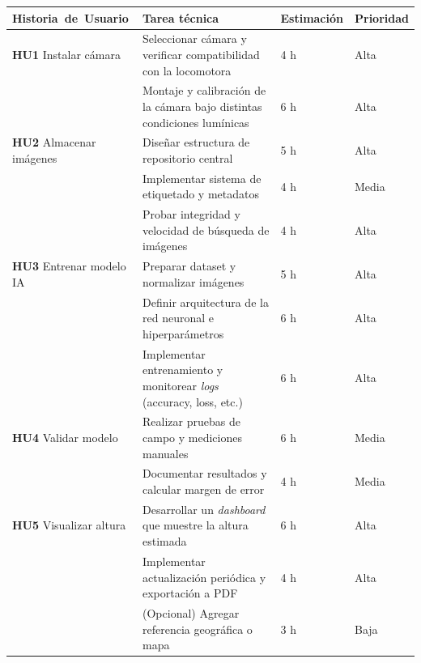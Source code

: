 \documentclass[
11pt, %
]{ProyectoVpC}
\begin{document}
\begin{table}[ht]
\centering
\renewcommand{\arraystretch}{1.15}
\begin{tabular}{@{}p{4.6cm} p{6cm} p{2cm} p{2.2cm}@{}}
\toprule
\textbf{\textbf{\mbox{Historia de Usuario}}} & \textbf{Tarea técnica} & \textbf{Estimación} & \textbf{Prioridad} \\
\midrule

\textbf{HU1} Instalar cámara 
  & Seleccionar cámara y verificar compatibilidad con la locomotora 
  & 4 h  
  & Alta \\

  & Montaje y calibración de la cámara bajo distintas condiciones lumínicas 
  & 6 h  
  & Alta \\
\midrule

\textbf{HU2} Almacenar imágenes 
  & Diseñar estructura de repositorio central 
  & 5 h  
  & Alta \\

  & Implementar sistema de etiquetado y metadatos 
  & 4 h  
  & Media \\

  & Probar integridad y velocidad de búsqueda de imágenes 
  & 4 h  
  & Alta \\
\midrule

\textbf{HU3} Entrenar modelo IA
  & Preparar dataset y normalizar imágenes 
  & 5 h  
  & Alta \\

  & Definir arquitectura de la red neuronal e hiperparámetros 
  & 6 h  
  & Alta \\

  & Implementar entrenamiento y monitorear \emph{logs} (accuracy, loss, etc.) 
  & 6 h  
  & Alta \\
\midrule

\textbf{HU4} Validar modelo
  & Realizar pruebas de campo y mediciones manuales 
  & 6 h  
  & Media \\

  & Documentar resultados y calcular margen de error 
  & 4 h  
  & Media \\
\midrule

\textbf{HU5} Visualizar altura
  & Desarrollar un \emph{dashboard} que muestre la altura estimada 
  & 6 h  
  & Alta \\

  & Implementar actualización periódica y exportación a PDF 
  & 4 h  
  & Alta \\

  & (Opcional) Agregar referencia geográfica o mapa 
  & 3 h  
  & Baja \\
\midrule


\end{tabular}
\end{table}
\end{document}
